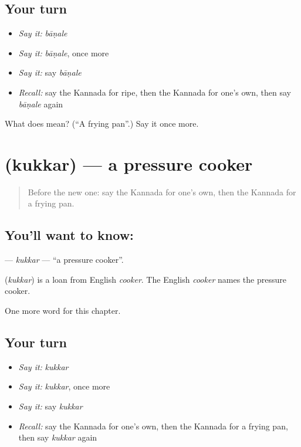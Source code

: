 \subsection*{Your turn}
\begin{itemize}
\raggedright
  \item \emph{Say it:} \emph{bāṇale}
  \item \emph{Say it:} \emph{bāṇale}, once more
  \item \emph{Say it:} say \emph{bāṇale}
  \item \emph{Recall:} say the Kannada for ripe, then the Kannada for one's own, then say \emph{bāṇale} again
\end{itemize}

\begin{tcolorbox}[breakable,colback=teal!4,colframe=teal!35!black,title={Before you move on}]
What does  mean? (\textquotedblleft{}A frying pan\textquotedblright{}.) Say it once more.
\end{tcolorbox}
\section[\texorpdfstring{\kn{ಕುಕ್ಕರ್} (kukkar)}{ಕುಕ್ಕರ್ (kukkar)}]{ (kukkar) — a pressure cooker}

\label{lesson:KA-C183-kukkar}



\begin{quote}
Before the new one: say the Kannada for one's own, then the Kannada for a frying pan.
\end{quote}

\subsection*{You'll want to know: }
\textbf{} — \emph{kukkar} — \textquotedblleft{}a pressure cooker\textquotedblright{}.

\begin{cousinweb}
\textbf{} (\emph{kukkar}) is a loan from English \emph{cooker}. The English \emph{cooker} names the pressure cooker.
\end{cousinweb}

\begin{grammarlens}[title={What you've built}]
One more word for this chapter.
\end{grammarlens}

\subsection*{Your turn}
\begin{itemize}
\raggedright
  \item \emph{Say it:} \emph{kukkar}
  \item \emph{Say it:} \emph{kukkar}, once more
  \item \emph{Say it:} say \emph{kukkar}
  \item \emph{Recall:} say the Kannada for one's own, then the Kannada for a frying pan, then say \emph{kukkar} again
\end{itemize}

